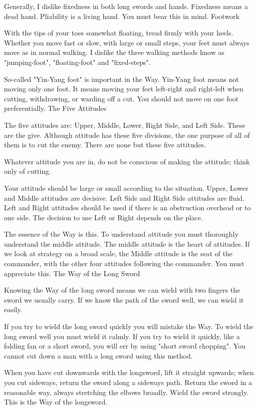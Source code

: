 Generally, I dislike fixedness in both long swords and hands. Fixedness means a dead hand. Pliability is a living hand. You must bear this in mind.
Footwork

With the tips of your toes somewhat floating, tread firmly with your heels. Whether you move fast or slow, with large or small steps, your feet must always move as in normal walking. I dislike the three walking methods know as "jumping-foot", "floating-foot" and "fixed-steps".

So-called "Yin-Yang foot" is important in the Way. Yin-Yang foot means not moving only one foot. It means moving your feet left-right and right-left when cutting, withdrawing, or warding off a cut. You should not move on one foot preferentially.
The Five Attitudes

The five attitudes are: Upper, Middle, Lower, Right Side, and Left Side. These are the give. Although attitude has these five divisions, the one purpose of all of them is to cut the enemy. There are none but these five attitudes.

Whatever attitude you are in, do not be conscious of making the attitude; think only of cutting.

Your attitude should be large or small according to the situation. Upper, Lower and Middle attitudes are decisive. Left Side and Right Side attitudes are fluid. Left and Right attitudes should be used if there is an obstruction overhead or to one side. The decision to use Left or Right depends on the place.

The essence of the Way is this. To understand attitude you must thoroughly understand the middle attitude. The middle attitude is the heart of attitudes. If we look at strategy on a broad scale, the Middle attitude is the seat of the commander, with the other four attitudes following the commander. You must appreciate this.
The Way of the Long Sword

Knowing the Way of the long sword means we can wield with two fingers the sword we usually carry. If we know the path of the sword well, we can wield it easily.

If you try to wield the long sword quickly you will mistake the Way. To wield the long sword well you must wield it calmly. If you try to wield it quickly, like a folding fan or a short sword, you will err by using "short sword chopping". You cannot cut down a man with a long sword using this method.

When you have cut downwards with the longsword, lift it straight upwards; when you cut sideways, return the sword along a sideways path. Return the sword in a reasonable way, always stretching the elbows broadly. Wield the sword strongly. This is the Way of the longsword.

